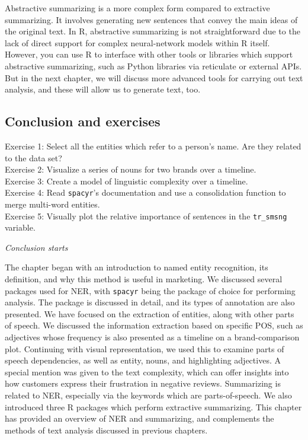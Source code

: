 Abstractive summarizing is a more complex form
compared to extractive summarizing. It involves generating new
sentences that convey the main ideas of the original text. In R,
abstractive summarizing is not straightforward due to the lack of direct support for complex neural-network models within R itself. However, you can use R to interface with
other tools or libraries which support abstractive summarizing, such as
Python libraries via reticulate or external APIs. But in the next
chapter, we will discuss more advanced tools for carrying out text
analysis, and these will allow us to generate text, too.

\subsection{Conclusion and exercises}\label{conclusions-and-exercises}

Exercise 1: Select all the entities which refer to a person's name. Are
they related to the data set?\\
Exercise 2: Visualize a series of nouns for two brands over a
timeline.\\
Exercise 3: Create a model of linguistic complexity over a timeline.\\
Exercise 4: Read \texttt{spacyr}'s documentation and use a
consolidation function to merge multi-word entities.\\
Exercise 5: Visually plot the relative importance of sentences in the
\texttt{tr\_smsng} variable.

\emph{Conclusion starts}

The chapter began with an introduction to named entity recognition, its
definition, and why this method is useful in marketing. We discussed several packages used for
NER, with \texttt{spacyr} being the package of
choice for performing analysis. The package is discussed in detail,
and its types of annotation are also presented. 
We have focused on the extraction of entities, along with other parts of speech. We discussed
the information extraction based on specific POS, such as
adjectives whose frequency is also presented as a timeline on a brand-comparison plot. Continuing with visual representation, we used this to examine parts of speech dependencies, as well as entity,
nouns, and highlighting adjectives. A special mention was given to the
text complexity, which can offer insights into how customers express
their frustration in negative reviews. Summarizing is related to NER,
especially via the keywords which are parts-of-speech. We also introduced three R packages
which perform extractive summarizing. This chapter has
provided an overview of NER and summarizing, and complements the methods of
text analysis discussed in previous chapters.
